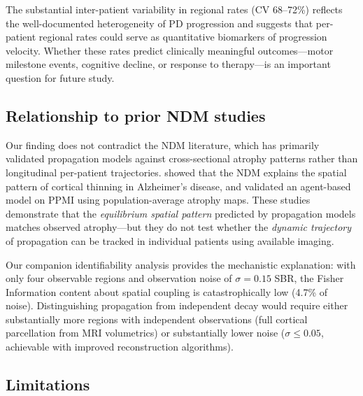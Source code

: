 The substantial inter-patient variability in regional rates (CV 68--72\%) reflects the well-documented heterogeneity of PD progression \cite{simuni2024} and suggests that per-patient regional rates could serve as quantitative biomarkers of progression velocity. Whether these rates predict clinically meaningful outcomes---motor milestone events, cognitive decline, or response to therapy---is an important question for future study.

\subsection{Relationship to prior NDM studies}

Our finding does not contradict the NDM literature, which has primarily validated propagation models against cross-sectional atrophy patterns rather than longitudinal per-patient trajectories. \cite{raj2012} showed that the NDM explains the spatial pattern of cortical thinning in Alzheimer's disease, and \cite{abdelgawad2022} validated an agent-based model on PPMI using population-average atrophy maps. These studies demonstrate that the \textit{equilibrium spatial pattern} predicted by propagation models matches observed atrophy---but they do not test whether the \textit{dynamic trajectory} of propagation can be tracked in individual patients using available imaging.

Our companion identifiability analysis \cite{dupre2026paper8a} provides the mechanistic explanation: with only four observable regions and observation noise of $\sigma = 0.15$ SBR, the Fisher Information content about spatial coupling is catastrophically low (4.7\% of noise). Distinguishing propagation from independent decay would require either substantially more regions with independent observations (full cortical parcellation from MRI volumetrics) or substantially lower noise ($\sigma \leq 0.05$, achievable with improved reconstruction algorithms).

\subsection{Limitations}

